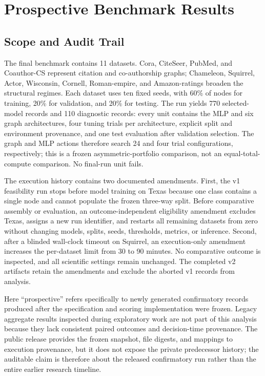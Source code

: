 \section{Prospective Benchmark Results}
\label{sec:prospective}

\subsection{Scope and Audit Trail}

The final benchmark contains 11 datasets. Cora, CiteSeer, PubMed, and Coauthor-CS represent citation and co-authorship graphs; Chameleon, Squirrel, Actor, Wisconsin, Cornell, Roman-empire, and Amazon-ratings broaden the structural regimes. Each dataset uses ten fixed seeds, with 60\% of nodes for training, 20\% for validation, and 20\% for testing. The run yields 770 selected-model records and 110 diagnostic records: every unit contains the MLP and six graph architectures, four tuning trials per architecture, explicit split and environment provenance, and one test evaluation after validation selection. The graph and MLP actions therefore search 24 and four trial configurations, respectively; this is a frozen asymmetric-portfolio comparison, not an equal-total-compute comparison. No final-run unit fails.

The execution history contains two documented amendments. First, the v1 feasibility run stops before model training on Texas because one class contains a single node and cannot populate the frozen three-way split. Before comparative assembly or evaluation, an outcome-independent eligibility amendment excludes Texas, assigns a new run identifier, and restarts all remaining datasets from zero without changing models, splits, seeds, thresholds, metrics, or inference. Second, after a blinded wall-clock timeout on Squirrel, an execution-only amendment increases the per-dataset limit from 30 to 90 minutes. No comparative outcome is inspected, and all scientific settings remain unchanged. The completed v2 artifacts retain the amendments and exclude the aborted v1 records from analysis.

Here ``prospective'' refers specifically to newly generated confirmatory records produced after the specification and scoring implementation were frozen. Legacy aggregate results inspected during exploratory work are not part of this analysis because they lack consistent paired outcomes and decision-time provenance. The public release provides the frozen snapshot, file digests, and mappings to execution provenance, but it does not expose the private predecessor history; the auditable claim is therefore about the released confirmatory run rather than the entire earlier research timeline.

